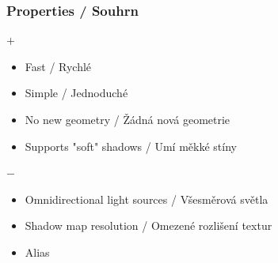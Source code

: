 \begin{frame}\frametitle{Properties / Souhrn}
  $+$
  \begin{itemize}
    \item Fast / Rychlé
    \item Simple / Jednoduché
    \item No new geometry / Žádná nová geometrie
    \item Supports "soft" shadows / Umí měkké stíny
  \end{itemize}
  \vfill
  $-$
  \begin{itemize}
    \item Omnidirectional light sources / Všesměrová světla
    \item Shadow map resolution / Omezené rozlišení textur
    \item Alias
  \end{itemize}
\end{frame}
